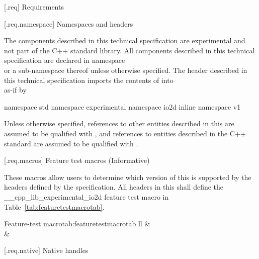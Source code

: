  [\iotwod.req] {Requirements}

 [\iotwod.req.namespace] {Namespaces and headers}

\pnum
The components described in this technical specification are experimental and 
not part of the C++ standard library. All components described in this 
technical specification are declared in namespace\\  or a sub-namespace thereof unless 
otherwise specified. The header described in this technical specification 
imports the contents of  into\\
 as-if by

\pnum
\begin{codeblock}
namespace std {
  namespace experimental {
    namespace io2d {
      inline namespace v1 { }
    }
  }
}
\end{codeblock}

\pnum
Unless otherwise specified, references to other entities described in this \documenttypename{} are assumed to be qualified with , and references to entities
described in the C++ standard are assumed to be qualified with .

 [\iotwod.req.macros] {Feature test macros (Informative)}

\pnum
These macros allow users to determine which version of this \documenttypename is supported by the headers deﬁned by the speciﬁcation. All headers in this \documenttypename shall deﬁne the __cpp_lib_experimental_io2d feature test macro in Table~\ref{tab:featuretestmacrotab}.

\begin{floattable}{Feature-test macro}{tab:featuretestmacrotab}
 {ll}
 \topline
  &  \\
 \capsep
  &  \\
\end{floattable}


%
%
 [\iotwod.req.native] {Native handles}

